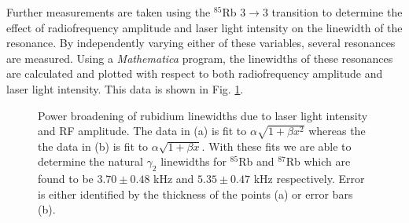 Further measurements are taken using the $^{85}$Rb $3\rightarrow3$ transition to determine the effect of radiofrequency amplitude and laser light intensity on the linewidth of the resonance. By independently varying either of these variables, several resonances are measured.  Using a \emph{Mathematica} program, the linewidths of these resonances are calculated and plotted with respect to both radiofrequency amplitude and laser light intensity.  This data is shown in Fig. \ref{fig:linewidths}.
\begin{figure}[h!]
\begin{center}
\hspace{-1mm}
\vspace{-2mm}
\vspace{-2mm}
\caption{\small{Power broadening of rubidium linewidths due to laser light intensity and RF amplitude.  The data in (a) is fit to $\alpha \sqrt{1+\beta x^2}$ whereas the the data in (b) is fit to $\alpha \sqrt{1+\beta x}$.  With these fits we are able to determine the natural $\gamma_2$ linewidths for $^{85}$Rb and $^{87}$Rb which are found to be $3.70 \pm 0.48$ kHz and $5.35 \pm 0.47$ kHz respectively.  Error is either identified by the thickness of the points (a) or error bars (b).}}\label{fig:linewidths}
\end{center}
\end{figure}
